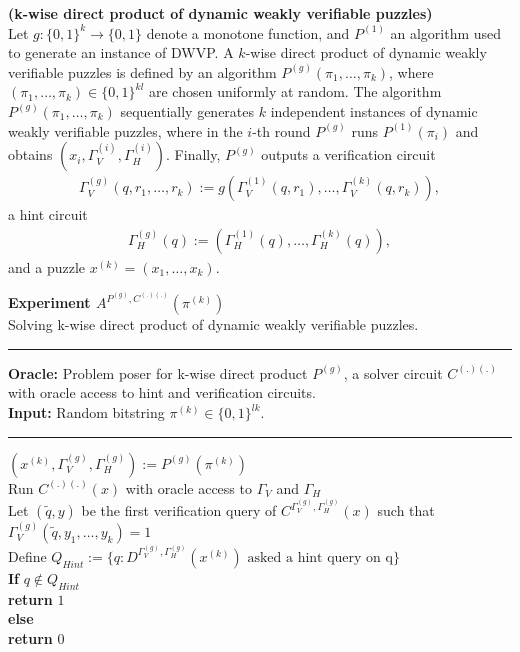 %
%
%
\begin{definition}{\textbf{(k-wise direct product of dynamic weakly verifiable puzzles)}}\\
Let $g: \{0,1\}^{k} \rightarrow \{0,1\}$ denote a monotone function, and $P^{(1)}$ an algorithm used to generate an instance of DWVP.
A $k$-wise direct product of dynamic weakly verifiable puzzles is defined by an algorithm $P^{(g)}\left(\pi_1, \dots, \pi_k \right)$,
where $(\pi_1, \dots, \pi_k) \in \{0,1\}^{kl}$ are chosen uniformly at random.
The algorithm $P^{(g)}\left(\pi_1, \dots, \pi_k \right)$ sequentially generates $k$ independent instances of dynamic weakly verifiable puzzles,
where in the $i$-th round $P^{(g)}$ runs $P^{(1)}(\pi_i)$ and obtains $(x_i, \Gamma_V^{(i)}, \Gamma_H^{(i)} )$.
Finally, $P^{(g)}$ outputs a verification circuit
\begin{align*}
  \Gamma_V^{(g)} (q, r_1, \dots, r_k) := g(\Gamma_V^{(1)}(q, r_1), \dots, \Gamma_V^{(k)}(q, r_k)),
\end{align*}
a hint circuit
\begin{align*}
  \Gamma_H^{(g)} (q) := (\Gamma_H^{(1)}(q), \dots, \Gamma_H^{(k)}(q)),
\end{align*}
and a puzzle $x^{(k)} = (x_1, \dots, x_k)$.
\end{definition}
%
\begin{codeblock}
  \textbf{Experiment $A^{P^{(g)}, C^{(.) (.)}}(\pi^{(k)})$} \\
  Solving k-wise direct product of dynamic weakly verifiable puzzles.
  \medskip

  \hrule

  \medskip

  \textbf{Oracle:} Problem poser for k-wise direct product $P^{(g)}$, a solver circuit $C^{(.)(.)}$ with oracle access to hint and verification circuits. \\
  \textbf{Input:} Random bitstring $\pi^{(k)} \in \{0,1\}^{lk}$.\\

  \medskip\hrule\medskip

  $(x^{(k)}, \Gamma_V^{(g)}, \Gamma_H^{(g)}) := P^{(g)}(\pi^{(k)})$ \\
  Run $C^{(.)(.)}(x)$ with oracle access to $\Gamma_V$ and $\Gamma_H$ \\
  \IndI Let $(\widetilde{q},y)$ be the first verification query of $C^{\Gamma_V^{(g)}, \Gamma_H^{(g)}}(x)$ such that $\Gamma_V^{(g)}(\widetilde{q},y_1, \dots, y_k) = 1$ \\
  \IndI Define $Q_{Hint} := \{q: \text{$D^{\Gamma_V^{(g)}, \Gamma_H^{(g)}}(x^{(k)})$ asked a hint query on q} \}$\\
  \textbf{If} $q \notin Q_{Hint}$\\
  \IndI \textbf{return} $1$\\
  \textbf{else}\\
  \IndI \textbf{return} $0$\\

\end{codeblock}
